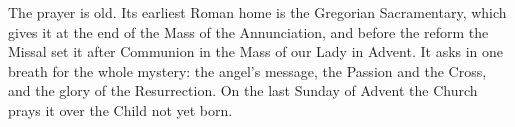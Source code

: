 \noindent The prayer is old. Its earliest Roman home is the Gregorian
Sacramentary, which gives it at the end of the Mass of the Annunciation, and
before the reform the Missal set it after Communion in the Mass of our Lady in
Advent. It asks in one breath for the whole mystery: the angel's message, the Passion
and the Cross, and the glory of the Resurrection. On the last Sunday of Advent
the Church prays it over the Child not yet born.
